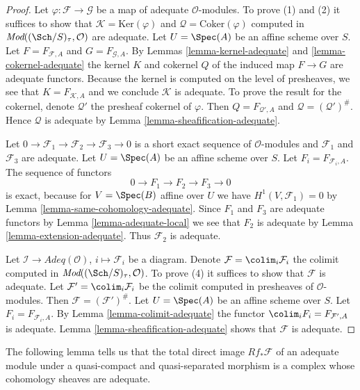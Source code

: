 \begin{proof}
Let $\varphi : \mathcal{F} \to \mathcal{G}$ be a map of adequate
$\mathcal{O}$-modules. To prove (1) and (2) it suffices to show that
$\mathcal{K} = \text{Ker}(\varphi)$ and
$\mathcal{Q} = \text{Coker}(\varphi)$ computed in
$\textit{Mod}((\Sch/S)_\tau, \mathcal{O})$ are adequate.
Let $U = \Spec(A)$ be an affine scheme over $S$.
Let $F = F_{\mathcal{F}, A}$ and $G = F_{\mathcal{G}, A}$.
By
Lemmas \ref{lemma-kernel-adequate} and
\ref{lemma-cokernel-adequate}
the kernel $K$ and cokernel $Q$ of the induced map
$F \to G$ are adequate functors.
Because the kernel is computed on the level of presheaves, we see
that $K = F_{\mathcal{K}, A}$ and we conclude $\mathcal{K}$ is adequate.
To prove the result for the cokernel, denote $\mathcal{Q}'$ the presheaf
cokernel of $\varphi$. Then $Q = F_{\mathcal{Q}', A}$ and
$\mathcal{Q} = (\mathcal{Q}')^\#$. Hence $\mathcal{Q}$
is adequate by
Lemma \ref{lemma-sheafification-adequate}.

\medskip\noindent
Let $0 \to \mathcal{F}_1 \to \mathcal{F}_2 \to \mathcal{F}_3 \to 0$
is a short exact sequence of $\mathcal{O}$-modules and
$\mathcal{F}_1$ and $\mathcal{F}_3$ are adequate.
Let $U = \Spec(A)$ be an affine scheme over $S$.
Let $F_i = F_{\mathcal{F}_i, A}$. The sequence of functors
$$
0 \to F_1 \to F_2 \to F_3 \to 0
$$
is exact, because for $V = \Spec(B)$ affine over $U$ we have
$H^1(V, \mathcal{F}_1) = 0$ by
Lemma \ref{lemma-same-cohomology-adequate}.
Since $F_1$ and $F_3$ are adequate functors by
Lemma \ref{lemma-adequate-local}
we see that $F_2$ is adequate by
Lemma \ref{lemma-extension-adequate}.
Thus $\mathcal{F}_2$ is adequate.

\medskip\noindent
Let $\mathcal{I} \to \textit{Adeq}(\mathcal{O})$, $i \mapsto \mathcal{F}_i$
be a diagram. Denote $\mathcal{F} = \colim_i \mathcal{F}_i$
the colimit computed in
$\textit{Mod}((\Sch/S)_\tau, \mathcal{O})$.
To prove (4) it suffices to show that $\mathcal{F}$ is adequate.
Let $\mathcal{F}' = \colim_i \mathcal{F}_i$ be the colimit computed
in presheaves of $\mathcal{O}$-modules. Then
$\mathcal{F} = (\mathcal{F}')^\#$.
Let $U = \Spec(A)$ be an affine scheme over $S$.
Let $F_i = F_{\mathcal{F}_i, A}$. By
Lemma \ref{lemma-colimit-adequate}
the functor $\colim_i F_i = F_{\mathcal{F}', A}$ is adequate.
Lemma \ref{lemma-sheafification-adequate}
shows that $\mathcal{F}$ is adequate.
\end{proof}

\noindent
The following lemma tells us that the total direct image
$Rf_*\mathcal{F}$ of an adequate module under a quasi-compact and
quasi-separated morphism is a complex whose cohomology sheaves
are adequate.

